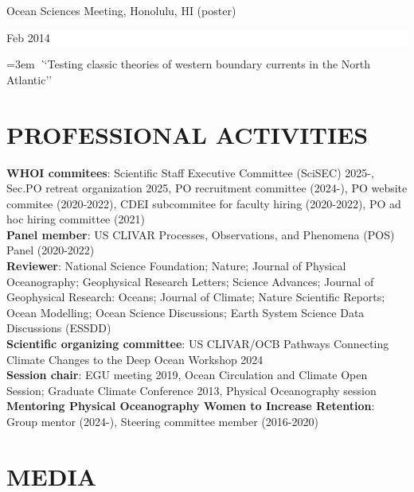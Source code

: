 \documentclass[paper=letter,fontsize=11pt]{scrartcl} %
\newcommand{\sepspace}{\vspace*{3mm}}		%
\newcommand{\NewPart}[2]{\section*{\uppercase{#1} #2}}
\newcommand{\ShortEntry}[2]{\normalsize \noindent \textbf{#1}: #2 \\ }
\newcommand{\TalkEntry}[3]{
		\noindent #1 \hfill      %
		\colorbox{White}{%
			\parbox{6em}{%
			\hfill\color{Black}#2}} \par  %
		\noindent\hangindent=3em\hangafter=0 \textit ``#3''\sepspace} %
\begin{document}
\TalkEntry{Ocean Sciences Meeting, Honolulu, HI (poster)}{Feb 2014}{Testing classic theories of western boundary currents in the North Atlantic}



\NewPart{Professional Activities}{}

\ShortEntry{WHOI commitees}{Scientific Staff Executive Committee (SciSEC) 2025-, Sec.PO retreat organization 2025, PO recruitment committee (2024-), PO website commitee (2020-2022), CDEI subcommitee for faculty hiring (2020-2022), PO ad hoc hiring committee (2021)}

\ShortEntry{Panel member}{US CLIVAR Processes, Observations, and Phenomena (POS) Panel (2020-2022)}

\ShortEntry{Reviewer}{National Science Foundation; Nature; Journal of Physical Oceanography; Geophysical Research Letters; Science Advances; Journal of Geophysical Research: Oceans; Journal of Climate; Nature Scientific Reports; Ocean Modelling; Ocean Science Discussions; Earth System Science Data Discussions (ESSDD)}

\ShortEntry{Scientific organizing committee}{US CLIVAR/OCB Pathways Connecting Climate Changes to the Deep Ocean Workshop 2024}

\ShortEntry{Session chair}{EGU meeting 2019, Ocean Circulation and Climate Open Session; Graduate Climate Conference 2013, Physical Oceanography session}

\ShortEntry{Mentoring Physical Oceanography Women to Increase Retention}{Group mentor (2024-), Steering committee member (2016-2020)}




\NewPart{Media}{}
\end{document}
